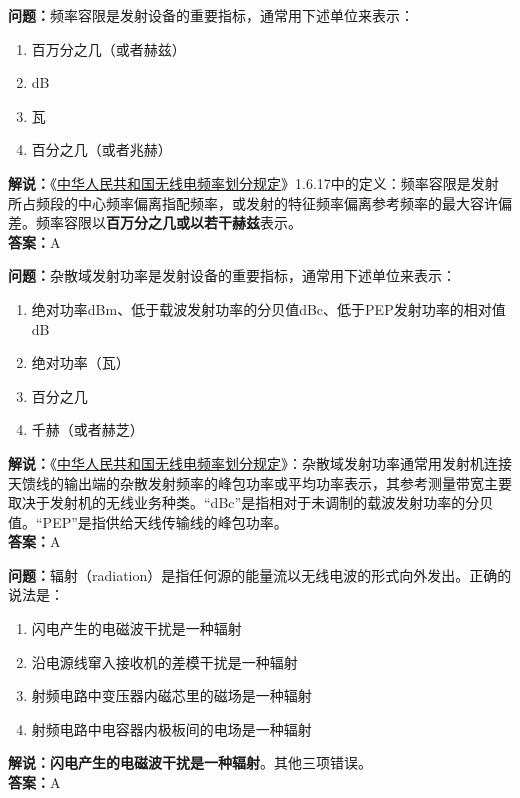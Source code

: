 \textbf{问题：}频率容限是发射设备的重要指标，通常用下述单位来表示：
\begin{enumerate}[label=\Alph*), leftmargin=1.5cm]
	\item 百万分之几（或者赫兹）
	\item dB
	\item 瓦
	\item 百分之几（或者兆赫）
\end{enumerate}
\textbf{解说：}《\href{https://www.miit.gov.cn/zwgk/zcwj/wjfb/txy/art/2020/art_066386284cd2449493586c81ccafed11.html}{中华人民共和国无线电频率划分规定}》1.6.17中的定义：频率容限是发射所占频段的中心频率偏离指配频率，或发射的特征频率偏离参考频率的最大容许偏差。频率容限以\textbf{百万分之几或以若干赫兹}表示。\\\textbf{答案：}A

\textbf{问题：}杂散域发射功率是发射设备的重要指标，通常用下述单位来表示：
\begin{enumerate}[label=\Alph*), leftmargin=1.5cm]
	\item 绝对功率dBm、低于载波发射功率的分贝值dBc、低于PEP发射功率的相对值dB
	\item 绝对功率（瓦）
	\item 百分之几
	\item 千赫（或者赫芝）
\end{enumerate}
\textbf{解说：}《\href{https://www.miit.gov.cn/zwgk/zcwj/wjfb/txy/art/2020/art_066386284cd2449493586c81ccafed11.html}{中华人民共和国无线电频率划分规定}》：杂散域发射功率通常用发射机连接天馈线的输出端的杂散发射频率的峰包功率或平均功率表示，其参考测量带宽主要取决于发射机的无线业务种类。“dBc”是指相对于未调制的载波发射功率的分贝值。“PEP”是指供给天线传输线的峰包功率。\\\textbf{答案：}A%

\textbf{问题：}辐射（radiation）是指任何源的能量流以无线电波的形式向外发出。正确的说法是：
\begin{enumerate}[label=\Alph*), leftmargin=1.5cm]
	\item 闪电产生的电磁波干扰是一种辐射
	\item 沿电源线窜入接收机的差模干扰是一种辐射
	\item 射频电路中变压器内磁芯里的磁场是一种辐射
	\item 射频电路中电容器内极板间的电场是一种辐射
\end{enumerate}
\textbf{解说：闪电产生的电磁波干扰是一种辐射}。其他三项错误。\\\textbf{答案：}A%

